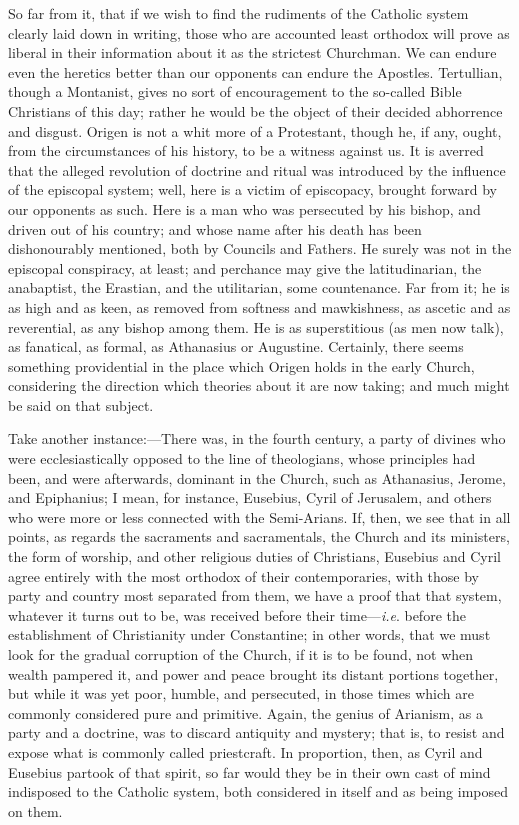 So far from it, that if we wish to find the rudiments of the
Catholic system clearly laid down in writing, those who are accounted
least orthodox will prove as liberal in their information about it as
the strictest Churchman. We can endure even the heretics better
than our opponents can endure the Apostles. Tertullian, though a
Montanist, gives no sort of encouragement to the so-called Bible
Christians of this day; rather he would be the object of their decided
abhorrence and disgust. Origen is not a whit more of a Protestant,
though he, if any, ought, from the circumstances of his history, to be
a witness against us. It is averred that the alleged revolution of
doctrine and ritual was introduced by the influence of the episcopal
system; well, here is a victim of episcopacy, brought forward by our
opponents as such. Here is a man who was persecuted by his bishop, and
driven out of his country; and whose name after his death has been
dishonourably mentioned, both by Councils and Fathers. He surely was
not in the episcopal conspiracy, at least; and perchance may give the
latitudinarian, the anabaptist, the Erastian, and the utilitarian,
some countenance. Far from it; he is as high and as keen, as removed
from softness and mawkishness, as ascetic and as reverential, as any
bishop among them. He is as superstitious (as men now talk), as
fanatical, as formal, as Athanasius or Augustine. Certainly, there
seems something providential in the place which Origen holds in the
early Church, considering the direction which theories about it are
now taking; and much might be said on that subject.

Take another instance:—There was, in the fourth century, a party
of divines who were ecclesiastically opposed to the line of
theologians, whose principles had been, and were afterwards, dominant
in the Church, such as Athanasius, Jerome, and Epiphanius; I mean, for
instance, Eusebius, Cyril of Jerusalem, and others who were more or
less connected with the Semi-Arians. If, then, we see that in all
points, as regards the sacraments and sacramentals, the Church
and its ministers, the form of worship, and other religious duties of
Christians, Eusebius and Cyril agree entirely with the most orthodox
of their contemporaries, with those by party and country most
separated from them, we have a proof that that system, whatever it
turns out to be, was received before their time—\emph{i.e}. before
the establishment of Christianity under Constantine; in other words,
that we must look for the gradual corruption of the Church, if it is
to be found, not when wealth pampered it, and power and peace brought
its distant portions together, but while it was yet poor, humble, and
persecuted, in those times which are commonly considered pure and
primitive. Again, the genius of Arianism, as a party and a doctrine,
was to discard antiquity and mystery; that is, to resist and expose
what is commonly called priestcraft. In proportion, then, as Cyril and
Eusebius partook of that spirit, so far would they be in their own
cast of mind indisposed to the Catholic system, both considered in
itself and as being imposed on them.

